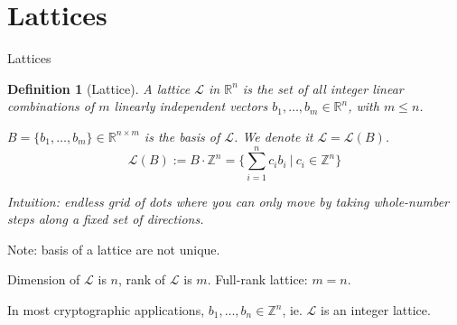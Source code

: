 \documentclass{beamer}
\theoremstyle{customstyle}
\newtheorem{defn}[thm]{Definition}
\newcommand{\Rr}{\mathbb{R}}
\newcommand{\Zz}{\mathbb{Z}}
\newcommand{\Ll}{\mathcal{L}}
\begin{document}

\section[Lattices]{Lattices}

\begin{frame}{Lattices}
  \begin{defn}[Lattice]
    A lattice $\Ll$ in $\Rr^n$ is the set of all integer linear combinations of $m$ linearly independent vectors $b_1, \ldots, b_m \in \Rr^n$, with $m \leq n$.

  \pause
  $B = \{b_1, \ldots, b_m\} \in \Rr^{n \times m}$ is the \emph{basis} of $\Ll$. We denote it $\Ll=\Ll(B)$.
  \vspace*{-0.3cm}
  $$\Ll(B) := B \cdot \Zz^n = \{ \sum_{i=1}^n c_i b_i ~|~ c_i \in \Zz^n \}$$
  \end{defn}

  \small
  \pause
  \begin{tcolorbox}[colback=gray!15, colframe=gray!15]
    \emph{Intuition: endless grid of dots where you can only move by taking whole-number
    steps along a fixed set of directions.}
  \end{tcolorbox}

  \pause
  Note: basis of a lattice are not unique.

  \pause
  Dimension of $\Ll$ is $n$, rank of $\Ll$ is $m$. Full-rank lattice: $m=n$.

  \pause
  In most cryptographic applications, $b_1, \ldots, b_n \in \Zz^n$, ie. $\Ll$ is an integer lattice.
  
\end{frame}
\end{document}

